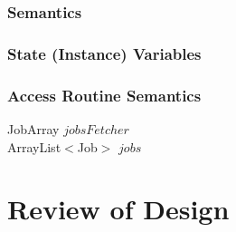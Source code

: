\documentclass[12pt,fleqn]{article}
\begin{document}
\subsubsection*{Semantics}
\subsubsection*{State (Instance) Variables}
\subsubsection*{Access Routine Semantics}
		JobArray $jobsFetcher$\\
		ArrayList$<$Job$>$ $ jobs$



\newpage
\section*{Review of Design}
\end{document}
